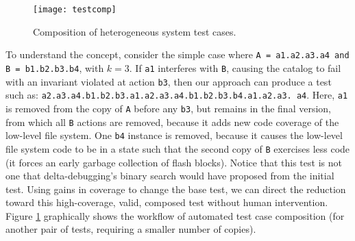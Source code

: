 
\begin{figure}
\centering
\texttt{[image: testcomp]}
\caption{Composition of heterogeneous system test cases.}
\label{fig:compose}
\end{figure}

To understand the concept, consider the simple case where {\tt A =
  a1.a2.a3.a4 and B = b1.b2.b3.b4}, with $k = 3$.  If {\tt a1}
interferes with {\tt B}, causing the catalog to fail with an invariant
violated at action {\tt b3}, then our approach can produce a test such
as: {\tt a2.a3.a4.b1.b2.b3.a1.a2.a3.a4.b1.b2.b3.b4.a1.a2.a3. a4}. Here,
{\tt a1} is removed from the copy of {\tt A} before any {\tt b3}, but
remains in the final version, from which all {\tt B} actions are
removed, because it adds new code coverage of the low-level file
system.  One {\tt b4} instance is removed, because it causes the
low-level file system code to be in a state such that the second copy
of {\tt B} exercises less code (it forces an early garbage collection
of flash blocks).  Notice that this test is not one that
delta-debugging's binary search would have proposed from the initial
test. Using gains in coverage to change the base test, we can direct
the reduction toward this high-coverage, valid, composed test without
human intervention.  Figure \ref{fig:compose} graphically shows the workflow of
automated test case composition (for another pair of tests, requiring
a smaller number of copies).

